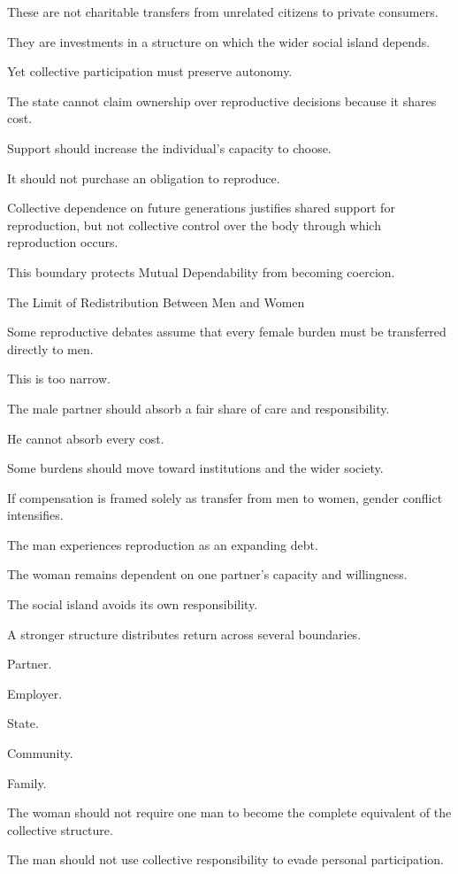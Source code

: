 These are not charitable transfers from unrelated citizens to private consumers.

They are investments in a structure on which the wider social island depends.

Yet collective participation must preserve autonomy.

The state cannot claim ownership over reproductive decisions because it shares cost.

Support should increase the individual’s capacity to choose.

It should not purchase an obligation to reproduce.

Collective dependence on future generations justifies shared support for reproduction, but not collective control over the body through which reproduction occurs.

This boundary protects Mutual Dependability from becoming coercion.

The Limit of Redistribution Between Men and Women

Some reproductive debates assume that every female burden must be transferred directly to men.

This is too narrow.

The male partner should absorb a fair share of care and responsibility.

He cannot absorb every cost.

Some burdens should move toward institutions and the wider society.

If compensation is framed solely as transfer from men to women, gender conflict intensifies.

The man experiences reproduction as an expanding debt.

The woman remains dependent on one partner’s capacity and willingness.

The social island avoids its own responsibility.

A stronger structure distributes return across several boundaries.

Partner.

Employer.

State.

Community.

Family.

The woman should not require one man to become the complete equivalent of the collective structure.

The man should not use collective responsibility to evade personal participation.

